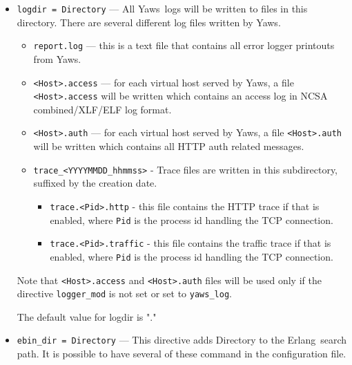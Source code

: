 \documentclass[11pt,oneside,english]{book}
\newcommand{\Erlang}            %
        {{\sc Erlang}}
\newcommand{\Yaws}            %
        {{\sc Yaws}}
\begin{document}
\begin{itemize}


\item       \verb+logdir = Directory+ ---
              All \Yaws\  logs will be  written  to  files  in  this
              directory.  There  are  several different log files
              written by \Yaws{}.

              \begin{itemize}
              \item \verb+report.log+ --- this is a text file that contains  all
              error logger printouts from \Yaws{}.
              \item \verb+<Host>.access+ --- for each virtual host served
                by \Yaws{}, a file \verb+<Host>.access+ will be written
                which contains an access log in NCSA combined/XLF/ELF log
                format.
              \item \verb+<Host>.auth+ --- for each virtual host served by
              \Yaws{}, a file \verb+<Host>.auth+ will be written which
              contains all HTTP auth related messages.
              \item \verb+trace_<YYYYMMDD_hhmmss>+ - Trace files are written in
              this subdirectory, suffixed by the creation date.
              \begin{itemize}
              \item \verb+trace.<Pid>.http+ - this file contains the HTTP
              trace if that is enabled, where \verb+Pid+ is the process id
              handling the TCP connection.
              \item \verb+trace.<Pid>.traffic+ - this file contains the
              traffic trace if that is enabled, where \verb+Pid+ is the
              process id handling the TCP connection.
              \end{itemize}
              \end{itemize}

              Note that \verb+<Host>.access+ and \verb+<Host>.auth+ files will
              be used only if the directive \verb+logger_mod+ is not set or set
              to \verb+yaws_log+.

              The default value for logdir is "."

\item        \verb+ebin_dir = Directory+ ---
              This  directive adds Directory to the \Erlang\  search
              path. It is possible to have several of these  command
              in the configuration file.


\end{itemize}
\end{document}
